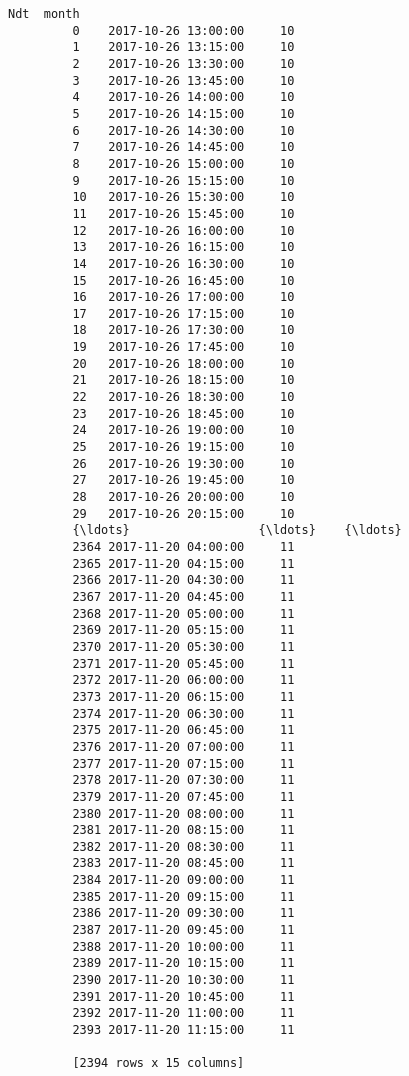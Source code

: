 \documentclass[11pt]{article}
\begin{document}
\begin{Verbatim}[commandchars=\\\{\}]
                              Ndt  month  
         0    2017-10-26 13:00:00     10  
         1    2017-10-26 13:15:00     10  
         2    2017-10-26 13:30:00     10  
         3    2017-10-26 13:45:00     10  
         4    2017-10-26 14:00:00     10  
         5    2017-10-26 14:15:00     10  
         6    2017-10-26 14:30:00     10  
         7    2017-10-26 14:45:00     10  
         8    2017-10-26 15:00:00     10  
         9    2017-10-26 15:15:00     10  
         10   2017-10-26 15:30:00     10  
         11   2017-10-26 15:45:00     10  
         12   2017-10-26 16:00:00     10  
         13   2017-10-26 16:15:00     10  
         14   2017-10-26 16:30:00     10  
         15   2017-10-26 16:45:00     10  
         16   2017-10-26 17:00:00     10  
         17   2017-10-26 17:15:00     10  
         18   2017-10-26 17:30:00     10  
         19   2017-10-26 17:45:00     10  
         20   2017-10-26 18:00:00     10  
         21   2017-10-26 18:15:00     10  
         22   2017-10-26 18:30:00     10  
         23   2017-10-26 18:45:00     10  
         24   2017-10-26 19:00:00     10  
         25   2017-10-26 19:15:00     10  
         26   2017-10-26 19:30:00     10  
         27   2017-10-26 19:45:00     10  
         28   2017-10-26 20:00:00     10  
         29   2017-10-26 20:15:00     10  
         {\ldots}                  {\ldots}    {\ldots}  
         2364 2017-11-20 04:00:00     11  
         2365 2017-11-20 04:15:00     11  
         2366 2017-11-20 04:30:00     11  
         2367 2017-11-20 04:45:00     11  
         2368 2017-11-20 05:00:00     11  
         2369 2017-11-20 05:15:00     11  
         2370 2017-11-20 05:30:00     11  
         2371 2017-11-20 05:45:00     11  
         2372 2017-11-20 06:00:00     11  
         2373 2017-11-20 06:15:00     11  
         2374 2017-11-20 06:30:00     11  
         2375 2017-11-20 06:45:00     11  
         2376 2017-11-20 07:00:00     11  
         2377 2017-11-20 07:15:00     11  
         2378 2017-11-20 07:30:00     11  
         2379 2017-11-20 07:45:00     11  
         2380 2017-11-20 08:00:00     11  
         2381 2017-11-20 08:15:00     11  
         2382 2017-11-20 08:30:00     11  
         2383 2017-11-20 08:45:00     11  
         2384 2017-11-20 09:00:00     11  
         2385 2017-11-20 09:15:00     11  
         2386 2017-11-20 09:30:00     11  
         2387 2017-11-20 09:45:00     11  
         2388 2017-11-20 10:00:00     11  
         2389 2017-11-20 10:15:00     11  
         2390 2017-11-20 10:30:00     11  
         2391 2017-11-20 10:45:00     11  
         2392 2017-11-20 11:00:00     11  
         2393 2017-11-20 11:15:00     11  
         
         [2394 rows x 15 columns]
\end{Verbatim}
            
\end{document}

